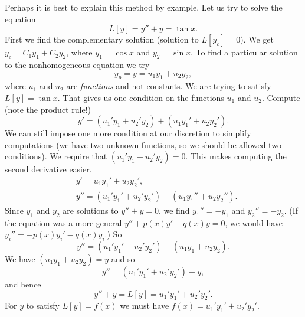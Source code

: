 Perhaps it is best to explain this method by example.
Let us try to solve the equation
\begin{equation*}
L[y] = y''+y = \tan x .
\end{equation*}
First we find the complementary solution (solution to $L[y_c] = 0$).  
We get $y_c = C_1 y_1 + C_2 y_2$, where $y_1 = \cos x$ and $y_2 = \sin x$.
To find a particular solution to the nonhomogeneous equation we try
\begin{equation*}
y_p = y = u_1 y_1 + u_2 y_2 ,
\end{equation*}
where $u_1$ and $u_2$ are \emph{functions} and not constants.
We are trying to satisfy $L[y] = \tan x$.  That gives us one condition on the
functions $u_1$ and $u_2$.
Compute (note the product rule!)
\begin{equation*}
y' = (u_1' y_1 + u_2' y_2) + (u_1 y_1' + u_2 y_2').
\end{equation*}
We can still
impose one more condition at our discretion to simplify computations (we have two unknown functions,
so we should be allowed two conditions).  We require that
$(u_1' y_1 + u_2' y_2) = 0$.  This makes computing the second derivative
easier.
\begin{align*}
& y' = u_1 y_1' + u_2 y_2' , \\
& y'' = (u_1' y_1' + u_2' y_2') + (u_1 y_1'' + u_2 y_2'') .
\end{align*}
Since $y_1$ and $y_2$ are solutions to $y''+y = 0$, we find
$y_1'' = - y_1$
and $y_2'' = - y_2$.
(If the equation was a more general $y''+p(x)y' +q(x)y = 0$, we would have
$y_i'' = -p(x)y_i' -q(x)y_i$.) So 
\begin{equation*}
y'' = (u_1' y_1' + u_2' y_2') - (u_1 y_1 + u_2 y_2) .
\end{equation*}
We have $(u_1 y_1 + u_2 y_2) = y$ and so
\begin{equation*}
y'' = (u_1' y_1' + u_2' y_2') - y ,
\end{equation*}
and hence
\begin{equation*}
y'' + y = L[y] = u_1' y_1' + u_2' y_2' .
\end{equation*}
For $y$ to satisfy $L[y] = f(x)$ we must have
$f(x) = u_1' y_1' + u_2' y_2'$.

